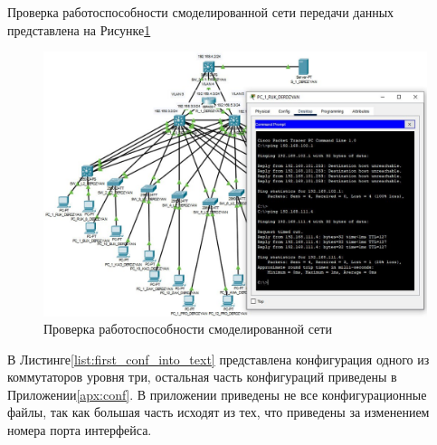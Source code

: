 Проверка работоспособности смоделированной сети передачи данных представлена на Рисунке\;\ref{fig:cisco_ping}

\begin{figure}[H]
\centering
\includegraphics[scale=0.45]{../misc/cisco_ping.png}
\caption{Проверка работоспособности смоделированной сети\label{fig:cisco_ping}}
\end{figure}

В Листинге\;\ref{list:first_conf_into_text} представлена конфигурация одного из коммутаторов уровня три, остальная часть конфигураций приведены в Приложении\;\ref{apx:conf}. В приложении приведены не все конфигурационные файлы, так как большая часть исходят из тех, что приведены за изменением номера порта интерфейса.







